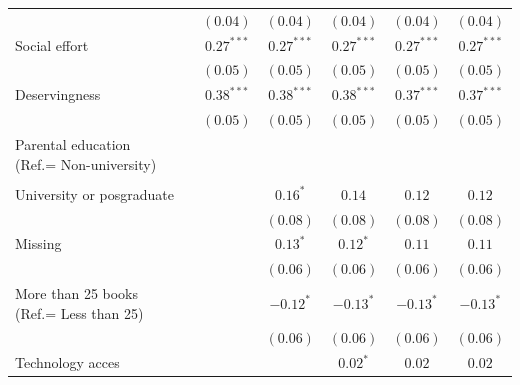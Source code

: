 \documentclass[
  12pt,
  letterpaper,
]{article}
\begin{document}
\begin{table}
{\begin{center}
{\begin{threeparttable}
\begin{tabular}{l c c c c c c}
                                                       &               & $(0.04)$      & $(0.04)$      & $(0.04)$      & $(0.04)$      & $(0.04)$      \\
Social effort                                          &               & $0.27^{***}$  & $0.27^{***}$  & $0.27^{***}$  & $0.27^{***}$  & $0.27^{***}$  \\
                                                       &               & $(0.05)$      & $(0.05)$      & $(0.05)$      & $(0.05)$      & $(0.05)$      \\
Deservingness                                          &               & $0.38^{***}$  & $0.38^{***}$  & $0.38^{***}$  & $0.37^{***}$  & $0.37^{***}$  \\
                                                       &               & $(0.05)$      & $(0.05)$      & $(0.05)$      & $(0.05)$      & $(0.05)$      \\
Parental education (Ref.= Non-university)              &               &               &               &               &               &               \\
                                                       &               &               &               &               &               &               \\
\quad University or posgraduate                        &               &               & $0.16^{*}$    & $0.14$        & $0.12$        & $0.12$        \\
                                                       &               &               & $(0.08)$      & $(0.08)$      & $(0.08)$      & $(0.08)$      \\
\quad Missing                                          &               &               & $0.13^{*}$    & $0.12^{*}$    & $0.11$        & $0.11$        \\
                                                       &               &               & $(0.06)$      & $(0.06)$      & $(0.06)$      & $(0.06)$      \\
More than 25 books (Ref.= Less than 25)                &               &               & $-0.12^{*}$   & $-0.13^{*}$   & $-0.13^{*}$   & $-0.13^{*}$   \\
                                                       &               &               & $(0.06)$      & $(0.06)$      & $(0.06)$      & $(0.06)$      \\
Technology acces                                       &               &               &               & $0.02^{*}$    & $0.02$        & $0.02$        \\

\end{tabular}
\end{threeparttable}}
\end{center}}
\end{table}
\end{document}
